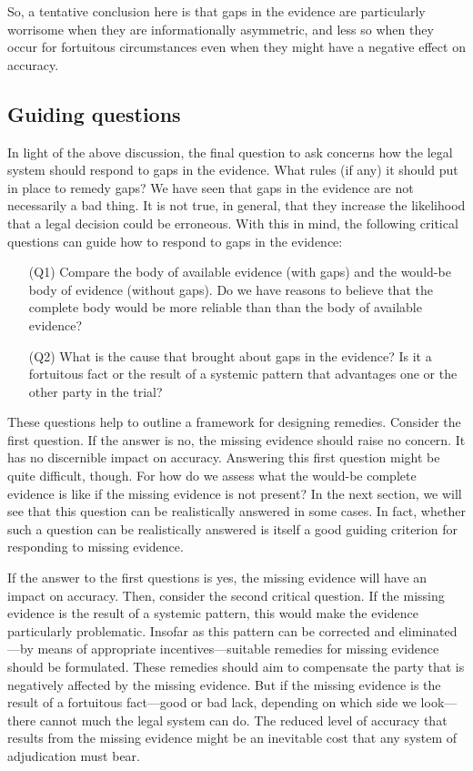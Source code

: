 \documentclass[
  10pt,
  dvipsnames,enabledeprecatedfontcommands]{scrartcl}
\begin{document}
So, a tentative conclusion here is that gaps in the evidence are
particularly worrisome when they are informationally asymmetric, and
less so when they occur for fortuitous circumstances even when they
might have a negative effect on accuracy.

\hypertarget{guiding-questions}{%
\subsection{Guiding questions}\label{guiding-questions}}

In light of the above discussion, the final question to ask concerns how
the legal system should respond to gaps in the evidence. What rules (if
any) it should put in place to remedy gaps? We have seen that gaps in
the evidence are not necessarily a bad thing. It is not true, in
general, that they increase the likelihood that a legal decision could
be erroneous. With this in mind, the following critical questions can
guide how to respond to gaps in the evidence:

\begin{itemize}

\item[(Q1)] Compare the body of available evidence (with gaps) and the would-be body of evidence (without gaps). Do we have reasons to believe that the complete body would be more reliable than than the body of available evidence? 

\item[(Q2)] What is the cause that brought about gaps in the evidence? Is it a fortuitous fact or the result of a systemic pattern that advantages one or the other party in the trial? 

\end{itemize}

\noindent These questions help to outline a framework for designing
remedies. Consider the first question. If the answer is no, the missing
evidence should raise no concern. It has no discernible impact on
accuracy. Answering this first question might be quite difficult,
though. For how do we assess what the would-be complete evidence is like
if the missing evidence is not present? In the next section, we will see
that this question can be realistically answered in some cases. In fact,
whether such a question can be realistically answered is itself a good
guiding criterion for responding to missing evidence.

If the answer to the first questions is yes, the missing evidence will
have an impact on accuracy. Then, consider the second critical question.
If the missing evidence is the result of a systemic pattern, this would
make the evidence particularly problematic. Insofar as this pattern can
be corrected and eliminated---by means of appropriate
incentives---suitable remedies for missing evidence should be
formulated. These remedies should aim to compensate the party that is
negatively affected by the missing evidence. But if the missing evidence
is the result of a fortuitous fact---good or bad lack, depending on
which side we look---there cannot much the legal system can do. The
reduced level of accuracy that results from the missing evidence might
be an inevitable cost that any system of adjudication must bear.
\end{document}
